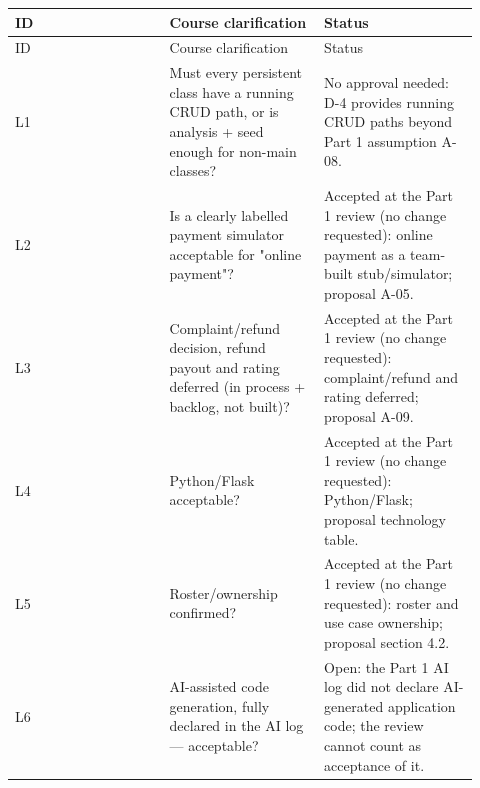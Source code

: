 \begin{longtable}{>{\raggedright\arraybackslash}p{0.3067\linewidth}>{\raggedright\arraybackslash}p{0.3067\linewidth}>{\raggedright\arraybackslash}p{0.3067\linewidth}}
ID & Course clarification & Status \\
\hline\endfirsthead
ID & Course clarification & Status \\
\hline\endhead
L1 & Must every persistent class have a running CRUD path, or is analysis + seed enough for non-main classes? & No approval needed: D-4 provides running CRUD paths beyond Part 1 assumption A-08. \\
L2 & Is a clearly labelled payment simulator acceptable for "online payment"? & Accepted at the Part 1 review (no change requested): online payment as a team-built stub/simulator; proposal A-05. \\
L3 & Complaint/refund decision, refund payout and rating deferred (in process + backlog, not built)? & Accepted at the Part 1 review (no change requested): complaint/refund and rating deferred; proposal A-09. \\
L4 & Python/Flask acceptable? & Accepted at the Part 1 review (no change requested): Python/Flask; proposal technology table. \\
L5 & Roster/ownership confirmed? & Accepted at the Part 1 review (no change requested): roster and use case ownership; proposal section 4.2. \\
L6 & AI-assisted code generation, fully declared in the AI log --- acceptable? & Open: the Part 1 AI log did not declare AI-generated application code; the review cannot count as acceptance of it. \\
\end{longtable}
